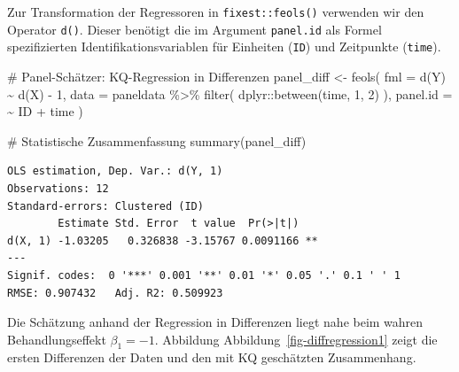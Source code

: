 \documentclass[
  a4paper,
  DIV=11,
  oneside]{scrreprt}
\newenvironment{Shaded}{\begin{snugshade}}{\end{snugshade}}
\newcommand{\AttributeTok}[1]{\textcolor[rgb]{0.40,0.45,0.13}{#1}}
\newcommand{\CommentTok}[1]{\textcolor[rgb]{0.37,0.37,0.37}{#1}}
\newcommand{\DecValTok}[1]{\textcolor[rgb]{0.68,0.00,0.00}{#1}}
\newcommand{\FunctionTok}[1]{\textcolor[rgb]{0.28,0.35,0.67}{#1}}
\newcommand{\NormalTok}[1]{\textcolor[rgb]{0.00,0.23,0.31}{#1}}
\newcommand{\OtherTok}[1]{\textcolor[rgb]{0.00,0.23,0.31}{#1}}
\newcommand{\SpecialCharTok}[1]{\textcolor[rgb]{0.37,0.37,0.37}{#1}}
\begin{document}
Zur Transformation der Regressoren in \texttt{fixest::feols()} verwenden
wir den Operator \texttt{d()}. Dieser benötigt die im Argument
\texttt{panel.id} als Formel spezifizierten Identifikationsvariablen für
Einheiten (\texttt{ID}) und Zeitpunkte (\texttt{time}).

\begin{Shaded}
\begin{Highlighting}[]
\CommentTok{\# Panel{-}Schätzer: KQ{-}Regression in Differenzen}
\NormalTok{panel\_diff }\OtherTok{\textless{}{-}} \FunctionTok{feols}\NormalTok{(}
  \AttributeTok{fml =} \FunctionTok{d}\NormalTok{(Y) }\SpecialCharTok{\textasciitilde{}} \FunctionTok{d}\NormalTok{(X) }\SpecialCharTok{{-}} \DecValTok{1}\NormalTok{, }
  \AttributeTok{data =}\NormalTok{ paneldata }\SpecialCharTok{\%\textgreater{}\%} 
      \FunctionTok{filter}\NormalTok{(}
\NormalTok{        dplyr}\SpecialCharTok{::}\FunctionTok{between}\NormalTok{(time, }\DecValTok{1}\NormalTok{, }\DecValTok{2}\NormalTok{)}
\NormalTok{      ),}
  \AttributeTok{panel.id =} \SpecialCharTok{\textasciitilde{}}\NormalTok{ ID }\SpecialCharTok{+}\NormalTok{ time}
\NormalTok{)}

\CommentTok{\# Statistische Zusammenfassung}
\FunctionTok{summary}\NormalTok{(panel\_diff)}
\end{Highlighting}
\end{Shaded}

\begin{verbatim}
OLS estimation, Dep. Var.: d(Y, 1)
Observations: 12
Standard-errors: Clustered (ID) 
        Estimate Std. Error  t value  Pr(>|t|)    
d(X, 1) -1.03205   0.326838 -3.15767 0.0091166 ** 
---
Signif. codes:  0 '***' 0.001 '**' 0.01 '*' 0.05 '.' 0.1 ' ' 1
RMSE: 0.907432   Adj. R2: 0.509923
\end{verbatim}

Die Schätzung anhand der Regression in Differenzen liegt nahe beim
wahren Behandlungseffekt \(\beta_1 = -1\). Abbildung
Abbildung~\ref{fig-diffregression1} zeigt die ersten Differenzen der
Daten und den mit KQ geschätzten Zusammenhang.
\end{document}
